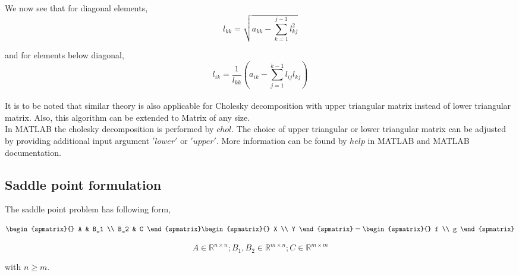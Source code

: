 \documentclass[a4paper,12pt]{book}
\begin{document}
We now see that for diagonal elements,\\

\begin{equation}
l_{kk} = \sqrt{a_{kk} - \sum_{k=1}^{j-1} l_{kj}^2}
\end{equation}

and for elements below diagonal,\\

\begin{equation}
l_{ik} = \frac{1}{l_{kk}}(a_{ik}-\sum_{j=1}^{k-1} l_{ij}l_{kj})
\end{equation}
\\
It is to be noted that similar theory is also applicable for Cholesky decomposition with upper triangular matrix instead of lower triangular matrix. Also, this algorithm can be extended to Matrix of any size. \\

In MATLAB the cholesky decomposition is performed by $chol$. The choice of upper triangular or lower triangular matrix can be adjusted by providing additional input argument $'lower'$ or $'upper'$. More information can be found by $help$ in MATLAB and MATLAB documentation.
 
\subsection{Saddle point formulation} \label{saddle_point} \cite{saddle}

The saddle point problem has following form,

\begin{equation} 
\begin{spmatrix}{}
    A & B_1 \\
    B_2 & C
\end{spmatrix}
\begin{spmatrix}{}
    X \\
    Y
\end{spmatrix}
=
\begin{spmatrix}{}
    f  \\
   	g
\end{spmatrix}
\end{equation}

\begin{equation}
A \in \mathbb{R}^{n \times n}; B_1, B_2 \in \mathbb{R}^{m \times n}; C \in \mathbb{R}^{m \times m} 
\end{equation}

with $n \geq m$.\\
\end{document}
